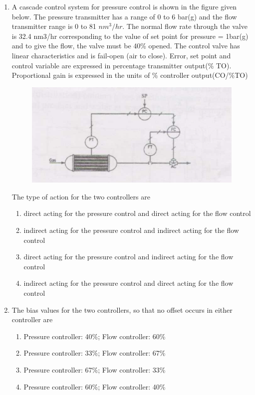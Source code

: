 \documentclass[journal,12pt,onecolumn]{IEEEtran}
\theoremstyle{remark}
\begin{document}
\begin{enumerate}
    \item A cascade control system for pressure control is shown in the figure given below. The pressure transmitter has a range of 0 to 6 bar(g) and the flow transmitter range is 0 to 81 $nm^3/hr$. The normal flow rate through the valve is 32.4 nm3/hr corresponding to the value of set point for pressure = 1bar(g) and to give the flow, the valve must be 40\% opened. The control valve has linear characteristics and is fail-open (air to close). Error, set point and control variable are expressed in percentage transmitter output(\% TO). Proportional gain is expressed in the units of \% controller output(CO/\%TO)

    \begin{figure}[H]
        \centering
        \includegraphics[width=0.5\columnwidth]{figs/71.png}
        \caption{}
        \label{fig:71}
    \end{figure}
The type of action for the two controllers are
\begin{enumerate}
    \item direct acting for the pressure control and direct acting for the flow control
    \item indirect acting for the pressure control and indirect acting for the flow control 
    \item direct acting for the pressure control and indirect acting for the flow control
    \item  indirect acting for the pressure control and direct acting for the flow control
\end{enumerate}

    \item The bias values for the two controllers, so that no offset occurs in either controller are

    \begin{enumerate}
        \item Pressure controller: 40\%; Flow controller: 60\%
        \item Pressure controller: 33\%; Flow controller: 67\%
        \item Pressure controller: 67\%; Flow controller: 33\%
        \item Pressure controller: 60\%; Flow controller: 40\%
    \end{enumerate}


\end{enumerate}
\end{document}
